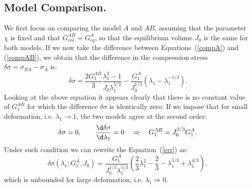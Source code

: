 \subsection{Model Comparison.}
We first focus on comparing the model $A$ and $AB$, assuming that the parameter $\chi$ is fixed and that $G^{AB}_{vol}=G^A_{eq}$, so that the equilibrium volume $J_0$ is the same for both models. If we now take the difference between Equations~(\ref{compA}) and (\ref{compAB}), we obtain that the difference in the compression stress $\delta \sigma= \sigma_{BA}-\sigma_{A}$ is:
\begin{equation}
\delta \sigma = \frac{2 G_1^{AB}}{3} \frac{\lambda_1^2-1}{J_0\lambda_1^{5/3}} - \frac{G_1^A}{J_0^{1/3}}(\lambda_1-\lambda_1^{-1/3}).\label{err}
\end{equation}
Looking at the above equation it appears clearly that there is no constant value of $G^{AB}_1$ for which the difference $\delta \sigma$ is identically zero. If we impose that for small deformation, i.e. $\lambda_1\rightarrow 1$, the two models agree at the second order:
\begin{equation}
\delta \sigma=0, \qquad \frac{\d \delta \sigma}{\d \lambda_1}=0 \quad\Rightarrow \quad G_1^{AB} = J_0^{2/3}G_1^A.
\end{equation}
Under such condition we can rewrite the Equation~(\ref{err}) as:
\begin{equation}
\delta \sigma(\lambda_1;G^A_1,J_0) = \frac{G_1^A}{J^{1/3}_0\lambda_1^{5/3}} \left(\frac{2}{3}\lambda^2_1-\frac{2}{3}-\lambda_1^{5/3}+\lambda_1^{4/3}\right), 
\end{equation}
which is unbounded for large deformation, i.e. $\lambda_1\Rightarrow0$.
